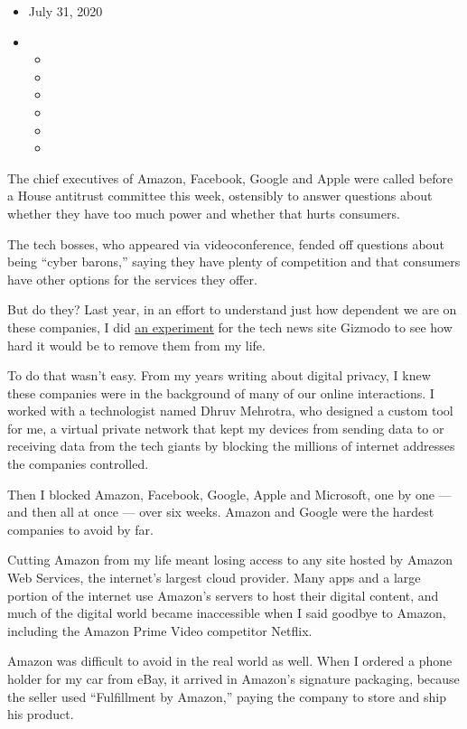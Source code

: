 \begin{itemize}
\item
  July 31, 2020
\item
  \begin{itemize}
  \item
  \item
  \item
  \item
  \item
  \item
  \end{itemize}
\end{itemize}

The chief executives of Amazon, Facebook, Google and Apple were called
before a House antitrust committee this week, ostensibly to answer
questions about whether they have too much power and whether that hurts
consumers.

The tech bosses, who appeared via videoconference, fended off questions
about being ``cyber barons,'' saying they have plenty of competition and
that consumers have other options for the services they offer.

But do they? Last year, in an effort to understand just how dependent we
are on these companies, I did
\href{https://gizmodo.com/c/goodbye-big-five}{an experiment} for the
tech news site Gizmodo to see how hard it would be to remove them from
my life.

To do that wasn't easy. From my years writing about digital privacy, I
knew these companies were in the background of many of our online
interactions. I worked with a technologist named Dhruv Mehrotra, who
designed a custom tool for me, a virtual private network that kept my
devices from sending data to or receiving data from the tech giants by
blocking the millions of internet addresses the companies controlled.

Then I blocked Amazon, Facebook, Google, Apple and Microsoft, one by one
--- and then all at once --- over six weeks. Amazon and Google were the
hardest companies to avoid by far.

Cutting Amazon from my life meant losing access to any site hosted by
Amazon Web Services, the internet's largest cloud provider. Many apps
and a large portion of the internet use Amazon's servers to host their
digital content, and much of the digital world became inaccessible when
I said goodbye to Amazon, including the Amazon Prime Video competitor
Netflix.

Amazon was difficult to avoid in the real world as well. When I ordered
a phone holder for my car from eBay, it arrived in Amazon's signature
packaging, because the seller used ``Fulfillment by Amazon,'' paying the
company to store and ship his product.

